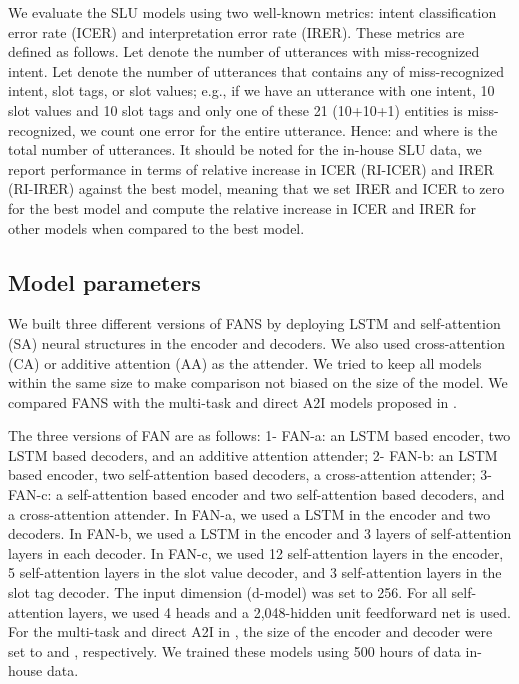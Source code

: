 \documentclass[a4paper]{article}
\begin{document}
We evaluate the SLU models using  two well-known metrics:  intent classification error rate (ICER)  and interpretation error rate (IRER). These metrics are defined as follows. Let  denote the number of utterances with miss-recognized intent. Let   denote the number of utterances  that contains  any of miss-recognized intent,  slot tags, or slot values; e.g., if we have an utterance with one intent, 10 slot values and 10 slot tags and only one of these 21 (10+10+1) entities is miss-recognized, we count one error for the entire utterance.  Hence:  and 
where  is the total number of utterances. It should be noted for the in-house SLU data, we report  performance in terms of  relative increase in ICER (RI-ICER) and IRER (RI-IRER) against the best model, meaning that we set IRER and ICER to zero for the best model and compute the relative increase in ICER and IRER for other models when compared  to the best model.

\subsection{Model parameters}
We built three different versions of FANS by deploying LSTM and self-attention (SA) \cite{vaswani2017attention} neural structures in the encoder and decoders. We also used  cross-attention  (CA)\cite{vaswani2017attention}  or  additive attention (AA) \cite{bahdanau2014neural} as the attender.  We tried to keep all models within the  same size to make comparison not biased on the size of the model.  We compared FANS with the multi-task and direct A2I models proposed in \cite{haghani2018audio} . 

The three versions of FAN are as follows: 1- FAN-a: an LSTM based encoder, two LSTM based decoders, and an additive attention attender; 2- FAN-b: an LSTM based encoder, two self-attention based decoders, a cross-attention attender; 3- FAN-c: a self-attention based encoder and two self-attention based decoders, and  a cross-attention attender. In FAN-a, we used a   LSTM in the encoder and two decoders.   In FAN-b, we used  a    LSTM in the encoder and 3 layers of self-attention layers in each decoder.  In FAN-c, we used 12 self-attention layers in the encoder, 5 self-attention layers in the slot value decoder, and 3 self-attention layers in the slot tag decoder. The input dimension (d-model) was set to 256. For all self-attention layers, we used 4 heads and a 2,048-hidden unit feedforward net is used. For the multi-task and direct A2I  in \cite{haghani2018audio},  the size of the encoder and decoder were set  to   and , respectively.  We trained these models using 500 hours of data in-house data. 
\end{document}
